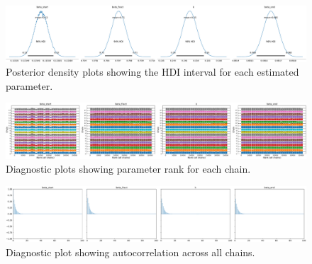 \documentclass[11pt]{article}
\begin{document}
    \begin{landscape}
    \begin{figure}
        \centering
        \includegraphics[scale=0.2]{model_posterior}
        \caption{Posterior density plots showing the HDI interval for each estimated parameter.}
        \label{model_posterior}
    \end{figure}
    \begin{figure}
        \centering
        \includegraphics[scale=0.2]{model_rank}
        \caption{Diagnostic plots showing parameter rank for each chain.}
        \label{model_rank}
    \end{figure}
    \begin{figure}
        \centering
        \includegraphics[scale=0.2]{model_autocorrelation}
        \caption{Diagnostic plot showing autocorrelation across all chains.}
        \label{model_autocorrelation}
    \end{figure}
    \end{landscape}



\end{document}

